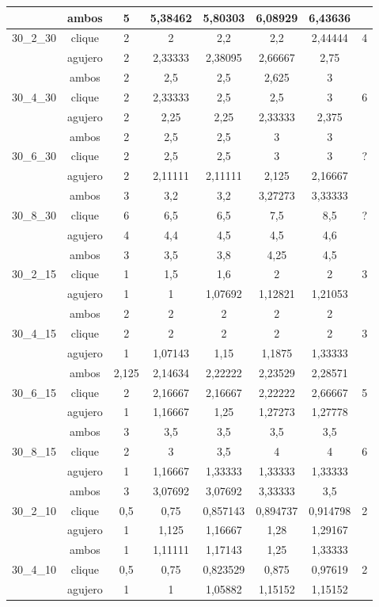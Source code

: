 \documentclass[a4paper]{article}
\begin{document}
\begin{center}
\begin{longtable}{|c|c|c|c|c|c|c|c|}
&ambos&5&5,38462&5,80303&6,08929&6,43636&\\
\hline
30_2_30&clique&2&2&2,2&2,2&2,44444&4\\
\cline{2-7}
&agujero&2&2,33333&2,38095&2,66667&2,75&\\
\cline{2-7}
&ambos&2&2,5&2,5&2,625&3&\\
\hline
30_4_30&clique&2&2,33333&2,5&2,5&3&6\\
\cline{2-7}
&agujero&2&2,25&2,25&2,33333&2,375&\\
\cline{2-7}
&ambos&2&2,5&2,5&3&3&\\
\hline
30_6_30&clique&2&2,5&2,5&3&3&?\\
\cline{2-7}
&agujero&2&2,11111&2,11111&2,125&2,16667&\\
\cline{2-7}
&ambos&3&3,2&3,2&3,27273&3,33333&\\
\hline
30_8_30&clique&6&6,5&6,5&7,5&8,5&?\\
\cline{2-7}
&agujero&4&4,4&4,5&4,5&4,6&\\
\cline{2-7}
&ambos&3&3,5&3,8&4,25&4,5&\\
\hline
30_2_15&clique&1&1,5&1,6&2&2&3\\
\cline{2-7}
&agujero&1&1&1,07692&1,12821&1,21053&\\
\cline{2-7}
&ambos&2&2&2&2&2&\\
\hline
30_4_15&clique&2&2&2&2&2&3\\
\cline{2-7}
&agujero&1&1,07143&1,15&1,1875&1,33333&\\
\cline{2-7}
&ambos&2,125&2,14634&2,22222&2,23529&2,28571&\\
\hline
30_6_15&clique&2&2,16667&2,16667&2,22222&2,66667&5\\
\cline{2-7}
&agujero&1&1,16667&1,25&1,27273&1,27778&\\
\cline{2-7}
&ambos&3&3,5&3,5&3,5&3,5&\\
\hline
30_8_15&clique&2&3&3,5&4&4&6\\
\cline{2-7}
&agujero&1&1,16667&1,33333&1,33333&1,33333&\\
\cline{2-7}
&ambos&3&3,07692&3,07692&3,33333&3,5&\\
\hline
30_2_10&clique&0,5&0,75&0,857143&0,894737&0,914798&2\\
\cline{2-7}
&agujero&1&1,125&1,16667&1,28&1,29167&\\
\cline{2-7}
&ambos&1&1,11111&1,17143&1,25&1,33333&\\
\hline
30_4_10&clique&0,5&0,75&0,823529&0,875&0,97619&2\\
\cline{2-7}
&agujero&1&1&1,05882&1,15152&1,15152&\\

\end{longtable}
\end{center}
\end{document}
